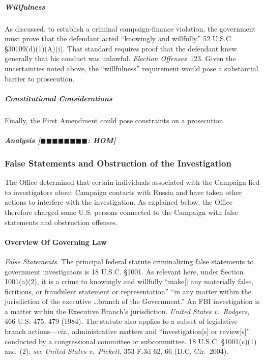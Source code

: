 \subparagraph{Willfulness}
As discussed, to establish a criminal campaign-finance violation, the government must prove that the defendant acted ``knowingly and willfully.''
52 U.S.C. \S 30109(d)(1)(A)(i).
That standard requires proof that the defendant knew generally that his conduct was unlawful.
\textit{Election Offenses}~123.
Given the uncertainties noted above, the ``willfulness'' requirement would pose a substantial barrier to prosecution.

\subparagraph{Constitutional Considerations}
Finally, the First Amendment could pose constraints on a prosecution.

\subparagraph{Analysis [$\blacksquare\blacksquare\blacksquare\blacksquare\blacksquare\blacksquare\blacksquare\blacksquare$: HOM]}



\subsubsection{False Statements and Obstruction of the Investigation}
The Office determined that certain individuals associated with the Campaign lied to investigators about Campaign contacts with Russia and have taken other actions to interfere with the investigation.
As explained below, the Office therefore charged some U.S. persons connected to the Campaign with false statements and obstruction offenses.

\paragraph{Overview Of Governing Law}
\textit{False Statements}.
The principal federal statute criminalizing false statements to government investigators is 18 U.S.C. \S 1001.
As relevant here, under Section 1001(a)(2), it is a crime to knowingly and willfully ``make[] any materially false, fictitious, or fraudulent statement or representation'' ``in any matter within the jurisdiction of the executive \dots branch of the Government.''
An FBI investigation is a matter within the Executive Branch's jurisdiction.
\textit{United States v.\ Rodgers}, 466 U.S. 475, 479 (1984).
The statute also applies to a subset of legislative branch actions---\textit{viz.}, administrative matters and ``investigation[s] or review[s]'' conducted by a congressional committee or subcommittee.
18 U.S.C. \S 1001(c)(1) and~(2); \textit{see United States v.\ Pickett}, 353 F.3d 62, 66 (D.C. Cir.~2004).

